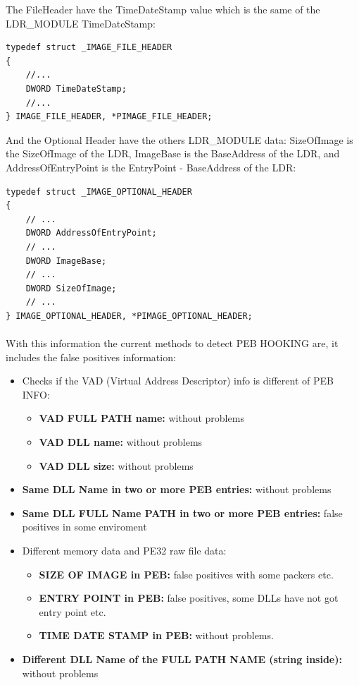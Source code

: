 \documentclass[12pt,a4paper,english]{book}
\newcommand{\paraph}{\paragraph{}}
\begin{document}
The FileHeader have the TimeDateStamp value which is the same of the LDR\_MODULE TimeDateStamp:
\lstset{language=C,caption=IMAGE\_FILE\_HEADER structure}
\begin{lstlisting}
typedef struct _IMAGE_FILE_HEADER 
{
    //...
    DWORD TimeDateStamp;
    //...
} IMAGE_FILE_HEADER, *PIMAGE_FILE_HEADER;
\end{lstlisting}

And the Optional Header have the others LDR\_MODULE data: SizeOfImage is the SizeOfImage of the LDR, ImageBase is the BaseAddress of the LDR, and AddressOfEntryPoint is the EntryPoint - BaseAddress of the LDR:
\lstset{language=C,caption=IMAGE\_OPTIONAL\_HEADER structure}
\begin{lstlisting}
typedef struct _IMAGE_OPTIONAL_HEADER 
{
    // ...
    DWORD AddressOfEntryPoint;
    // ...
    DWORD ImageBase;
    // ...
    DWORD SizeOfImage;
    // ...
} IMAGE_OPTIONAL_HEADER, *PIMAGE_OPTIONAL_HEADER;
\end{lstlisting}

\paraph{}
With this information the current methods to detect PEB HOOKING are, it includes the false positives information:

\begin{itemize}
\item { Checks if the VAD (Virtual Address Descriptor) info is different of PEB INFO:
\begin{itemize}
\item { {\bf VAD FULL PATH name:} without problems }
\item { {\bf VAD DLL name:} without problems }
\item { {\bf VAD DLL size:} without problems }
\end{itemize}
}
\item { {\bf Same DLL Name in two or more PEB entries:} without problems }
\item { {\bf Same DLL FULL Name PATH in two or more PEB entries:} false positives in some enviroment }
\item { Different memory data and PE32 raw file data:
\begin{itemize}
\item { {\bf SIZE OF IMAGE in PEB:} false positives with some packers etc. }
\item { {\bf ENTRY POINT in PEB:} false positives, some DLLs have not got entry point etc. }
\item { {\bf TIME DATE STAMP in PEB:} without problems. }
\end{itemize}
}
\item { {\bf Different DLL Name of the FULL PATH NAME (string inside):} without problems }
\end{itemize}
\end{document}

